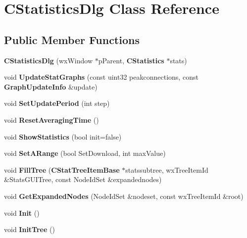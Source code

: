 \section{CStatisticsDlg Class Reference}
\label{classCStatisticsDlg}
\subsection*{Public Member Functions}
\begin{DoxyCompactItemize}
\item 
{\bfseries CStatisticsDlg} (wxWindow $\ast$pParent, {\bf CStatistics} $\ast$stats)\label{classCStatisticsDlg_ac732a2a5fc987c268b068a3142aaede0}

\item 
void {\bfseries UpdateStatGraphs} (const uint32 peakconnections, const {\bf GraphUpdateInfo} \&update)\label{classCStatisticsDlg_a86681eaafda90561397a438853e98eca}

\item 
void {\bfseries SetUpdatePeriod} (int step)\label{classCStatisticsDlg_a0ca22ccf4470c136061b921d7bd1c0bf}

\item 
void {\bfseries ResetAveragingTime} ()\label{classCStatisticsDlg_a0149b49c795fe6a29562293b98ef058c}

\item 
void {\bfseries ShowStatistics} (bool init=false)\label{classCStatisticsDlg_acdf657eda0b9578c0cf222dc94d5d85a}

\item 
void {\bfseries SetARange} (bool SetDownload, int maxValue)\label{classCStatisticsDlg_ac7d1b5f67a67cb8108fd2648ec71a0d9}

\item 
void {\bfseries FillTree} ({\bf CStatTreeItemBase} $\ast$statssubtree, wxTreeItemId \&StatsGUITree, const NodeIdSet \&expandednodes)\label{classCStatisticsDlg_a90043c3a35f19a9e42f12d03d78524c5}

\item 
void {\bfseries GetExpandedNodes} (NodeIdSet \&nodeset, const wxTreeItemId \&root)\label{classCStatisticsDlg_ab83fc3d8e0ffdd9a3c945abecc9651d9}

\item 
void {\bfseries Init} ()\label{classCStatisticsDlg_a1f86c10a388d2aa08ef1adb58dacd786}

\item 
void {\bfseries InitTree} ()\label{classCStatisticsDlg_a03789f468907be76160ecf46055a100e}


\end{DoxyCompactItemize}
